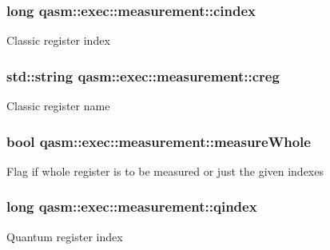 \subsubsection[{\texorpdfstring{cindex}{cindex}}]{\setlength{\rightskip}{0pt plus 5cm}long qasm\+::exec\+::measurement\+::cindex}\hypertarget{classqasm_1_1exec_1_1measurement_ab1ba29db121a9c17be8aacbd1f24ff7b}{}\label{classqasm_1_1exec_1_1measurement_ab1ba29db121a9c17be8aacbd1f24ff7b}
Classic register index 
\subsubsection[{\texorpdfstring{creg}{creg}}]{\setlength{\rightskip}{0pt plus 5cm}std\+::string qasm\+::exec\+::measurement\+::creg}\hypertarget{classqasm_1_1exec_1_1measurement_a419118b0574b066fdff6c7f00213dec3}{}\label{classqasm_1_1exec_1_1measurement_a419118b0574b066fdff6c7f00213dec3}
Classic register name 
\subsubsection[{\texorpdfstring{measure\+Whole}{measureWhole}}]{\setlength{\rightskip}{0pt plus 5cm}bool qasm\+::exec\+::measurement\+::measure\+Whole}\hypertarget{classqasm_1_1exec_1_1measurement_a1b67bc7f310bcba5a42989229268517d}{}\label{classqasm_1_1exec_1_1measurement_a1b67bc7f310bcba5a42989229268517d}
Flag if whole register is to be measured or just the given indexes 
\subsubsection[{\texorpdfstring{qindex}{qindex}}]{\setlength{\rightskip}{0pt plus 5cm}long qasm\+::exec\+::measurement\+::qindex}\hypertarget{classqasm_1_1exec_1_1measurement_a083137ce86d7f8b1f92a34a2db604063}{}\label{classqasm_1_1exec_1_1measurement_a083137ce86d7f8b1f92a34a2db604063}
Quantum register index 
